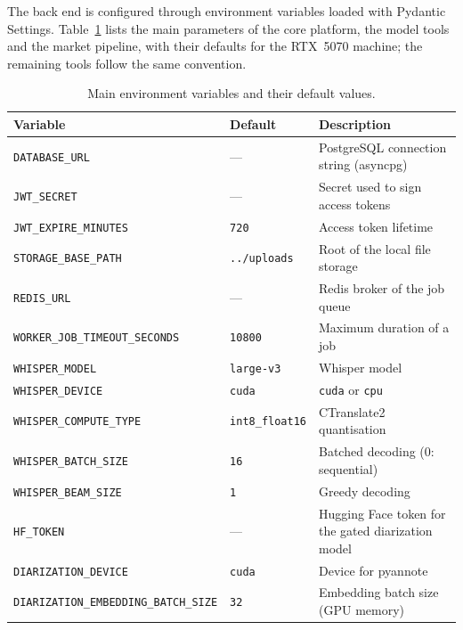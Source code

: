 \documentclass[ENG]{TFUOC}
\begin{document}
The back end is configured through environment variables loaded with Pydantic Settings. Table~\ref{tab:env_vars} lists the main parameters of the core platform, the model tools and the market pipeline, with their defaults for the RTX~5070 machine; the remaining tools follow the same convention.

\begin{table}[H]
\centering
\caption{Main environment variables and their default values.}
\label{tab:env_vars}
\small
\begin{tabular}{@{}llp{5.6cm}@{}}
\toprule
\textbf{Variable} & \textbf{Default} & \textbf{Description} \\
\midrule
\texttt{DATABASE\_URL}                     & ---                      & PostgreSQL connection string (asyncpg) \\
\texttt{JWT\_SECRET}                       & ---                      & Secret used to sign access tokens \\
\texttt{JWT\_EXPIRE\_MINUTES}              & \texttt{720}             & Access token lifetime \\
\texttt{STORAGE\_BASE\_PATH}               & \texttt{../uploads}      & Root of the local file storage \\
\texttt{REDIS\_URL}                        & ---                      & Redis broker of the job queue \\
\texttt{WORKER\_JOB\_TIMEOUT\_SECONDS}     & \texttt{10800}           & Maximum duration of a job \\
\texttt{WHISPER\_MODEL}                    & \texttt{large-v3}        & Whisper model \\
\texttt{WHISPER\_DEVICE}                   & \texttt{cuda}            & \texttt{cuda} or \texttt{cpu} \\
\texttt{WHISPER\_COMPUTE\_TYPE}            & \texttt{int8\_float16}   & CTranslate2 quantisation \\
\texttt{WHISPER\_BATCH\_SIZE}              & \texttt{16}              & Batched decoding (0: sequential) \\
\texttt{WHISPER\_BEAM\_SIZE}               & \texttt{1}               & Greedy decoding \\
\texttt{HF\_TOKEN}                         & ---                      & Hugging Face token for the gated diarization model \\
\texttt{DIARIZATION\_DEVICE}               & \texttt{cuda}            & Device for pyannote \\
\texttt{DIARIZATION\_EMBEDDING\_BATCH\_SIZE} & \texttt{32}            & Embedding batch size (GPU memory) \\

\end{tabular}
\end{table}
\end{document}
